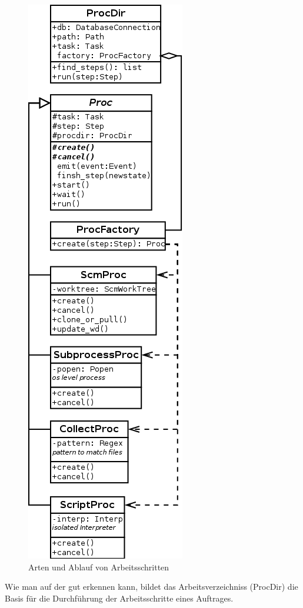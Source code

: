 \begin{figure}[!ht]
    \centering
    \includegraphics[height=0.8\textheight]{imageinput/klassen-arten-arbeitsschritt.png}
    \caption{Arten und Ablauf von Arbeitsschritten}
    \label{fig:klassen-arten-arbeitsschritt}
\end{figure}

Wie man auf der  gut erkennen kann,
bildet das Arbeitsverzeichniss (ProcDir) die Basis
für die Durchführung der Arbeitsschritte eines Auftrages.

